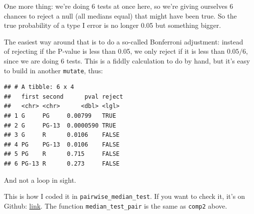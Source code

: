 \documentclass[]{tufte-book}
\newenvironment{Shaded}{}{}
\newcommand{\DataTypeTok}[1]{\textcolor[rgb]{0.56,0.13,0.00}{#1}}
\newcommand{\DecValTok}[1]{\textcolor[rgb]{0.25,0.63,0.44}{#1}}
\newcommand{\FloatTok}[1]{\textcolor[rgb]{0.25,0.63,0.44}{#1}}
\newcommand{\KeywordTok}[1]{\textcolor[rgb]{0.00,0.44,0.13}{\textbf{#1}}}
\newcommand{\NormalTok}[1]{#1}
\newcommand{\OperatorTok}[1]{\textcolor[rgb]{0.40,0.40,0.40}{#1}}
\newcommand{\StringTok}[1]{\textcolor[rgb]{0.25,0.44,0.63}{#1}}
\theoremstyle{definition}
\theoremstyle{definition}
\theoremstyle{definition}
\theoremstyle{remark}
\begin{document}
One more thing: we're doing 6 tests at once here, so we're giving
ourselves 6 chances to reject a null (all medians equal) that might have
been true. So the true probability of a type I error is no longer 0.05
but something bigger.

The easiest way around that is to do a so-called Bonferroni adjustment:
instead of rejecting if the P-value is less than 0.05, we only reject if
it is less than \(0.05/6\), since we are doing 6 tests. This is a fiddly
calculation to do by hand, but it's easy to build in another
\texttt{mutate}, thus:

\begin{Shaded}
\end{Shaded}

\begin{verbatim}
## # A tibble: 6 x 4
##   first second      pval reject
##   <chr> <chr>      <dbl> <lgl> 
## 1 G     PG     0.00799   TRUE  
## 2 G     PG-13  0.0000590 TRUE  
## 3 G     R      0.0106    FALSE 
## 4 PG    PG-13  0.0106    FALSE 
## 5 PG    R      0.715     FALSE 
## 6 PG-13 R      0.273     FALSE
\end{verbatim}

And not a loop in sight.

This is how I coded it in \texttt{pairwise\_median\_test}. If you want
to check it, it's on Github:
\href{https://raw.githubusercontent.com/nxskok/smmr/master/R/pairwise_median_test.R}{link}.
The function \texttt{median\_test\_pair} is the same as \texttt{comp2}
above.
\end{document}
